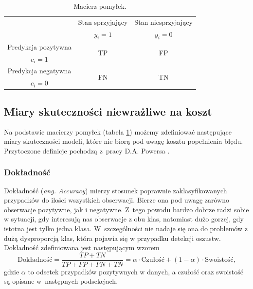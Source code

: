 \documentclass[inzynierska]{pwr_wmat_praca_dyplomowa}
\theoremstyle{plain}
\numberwithin{theorem}{chapter}
\theoremstyle{definition}
\numberwithin{theorem}{chapter}
\begin{document}
\begin{table}[h]
	\begin{center}
		\begin{tabular}{c|c|c}
			 \multirow{2}{8em}{} & Stan sprzyjający & Stan niesprzyjający \\
			                  & $y_i = 1$            & $y_i = 0$ \\
			 \hline
			  Predykcja pozytywna & \multirow{2}{8em}{\centering TP}& \multirow{2}{8em}{\centering FP} \\
			    $c_i = 1$ &  &                 \\
			 \hline
			 Predykcja negatywna & \multirow{2}{8em}{\centering FN} & \multirow{2}{8em}{\centering TN} \\
			   $c_i = 0$ &  &  \\
		\end{tabular}
	\end{center}
	\caption{Macierz pomyłek.}
	\label{tab:macierz-pomylek}
\end{table}

\subsection{Miary skuteczności niewrażliwe na koszt}
Na podstawie macierzy pomyłek (tabela \ref{tab:macierz-pomylek}) możemy zdefiniować następujące miary skuteczności modeli, które nie biorą pod uwagę kosztu popełnienia błędu. Przytoczone definicje pochodzą z~pracy D.A. Powersa \cite{evaluation_metrics}.

\subsubsection{Dokładność}
Dokładność (\textit{ang. Accuracy}) mierzy stosunek poprawnie zaklasyfikowanych przypadków do ilości wszystkich obserwacji. Bierze ona pod uwagę zarówno obserwacje pozytywne, jak i negatywne. Z~tego powodu bardzo dobrze radzi sobie w sytuacji, gdy interesują nas obserwacje z obu klas, natomiast dużo gorzej, gdy istotna jest tylko jedna klasa. W~szczególności nie nadaje się ona do problemów z dużą dysproporcją klas, która pojawia się w przypadku detekcji oszustw. Dokładność zdefiniowana jest następującym wzorem
$$ \text{Dokładność} = \frac{TP + TN}{TP + FP + FN + TN} = \alpha \cdot \text{Czułość} + (1-\alpha) \cdot \text{Swoistość} \text{,}$$
gdzie $\alpha$ to odsetek przypadków pozytywnych w danych, a czułość oraz swoistość są opisane w~następnych podsekcjach. 
\end{document}
